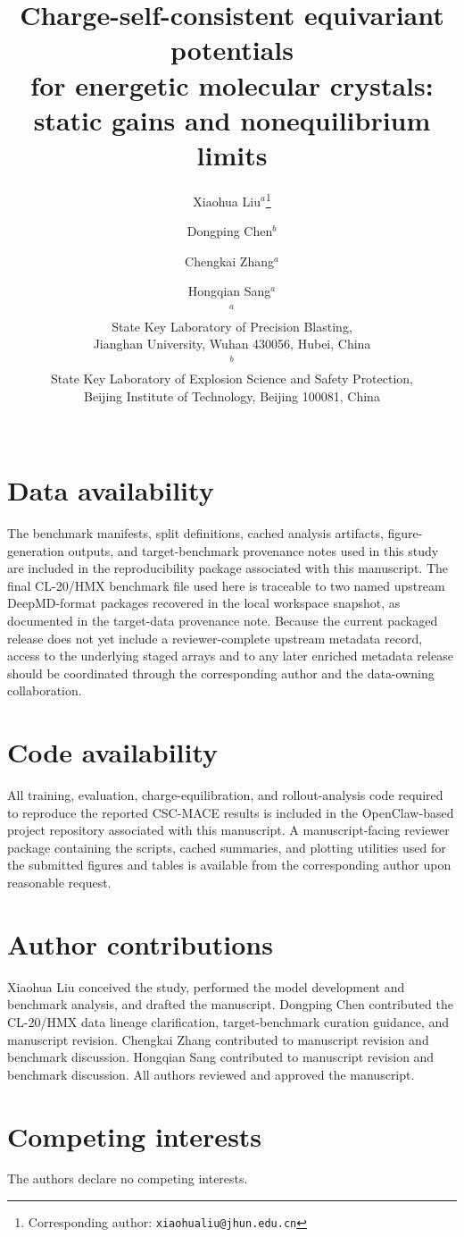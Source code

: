 \documentclass[11pt]{article}
\title{Charge-self-consistent equivariant potentials\\ for energetic molecular crystals: static gains and nonequilibrium limits}
\author{%
  Xiaohua Liu$^{a}$\thanks{Corresponding author: \texttt{xiaohualiu@jhun.edu.cn}}
  \and
  Dongping Chen$^{b}$
  \and
  Chengkai Zhang$^{a}$
  \and
  Hongqian Sang$^{a}$ \\
  $^{a}$\parbox{0.42\textwidth}{\centering State Key Laboratory of Precision Blasting,\\ Jianghan University, Wuhan 430056, Hubei, China}
  \hfill
  $^{b}$\parbox{0.42\textwidth}{\centering State Key Laboratory of Explosion Science and Safety Protection,\\ Beijing Institute of Technology, Beijing 100081, China} \\
}
\date{}
\begin{document}
\maketitle










\section*{Data availability}
The benchmark manifests, split definitions, cached analysis artifacts, figure-generation outputs, and target-benchmark provenance notes used in this study are included in the reproducibility package associated with this manuscript. The final CL-20/HMX benchmark file used here is traceable to two named upstream DeepMD-format packages recovered in the local workspace snapshot, as documented in the target-data provenance note. Because the current packaged release does not yet include a reviewer-complete upstream metadata record, access to the underlying staged arrays and to any later enriched metadata release should be coordinated through the corresponding author and the data-owning collaboration.

\section*{Code availability}
All training, evaluation, charge-equilibration, and rollout-analysis code required to reproduce the reported CSC-MACE results is included in the OpenClaw-based project repository associated with this manuscript. A manuscript-facing reviewer package containing the scripts, cached summaries, and plotting utilities used for the submitted figures and tables is available from the corresponding author upon reasonable request.

\section*{Author contributions}
Xiaohua Liu conceived the study, performed the model development and benchmark analysis, and drafted the manuscript. Dongping Chen contributed the CL-20/HMX data lineage clarification, target-benchmark curation guidance, and manuscript revision. Chengkai Zhang contributed to manuscript revision and benchmark discussion. Hongqian Sang contributed to manuscript revision and benchmark discussion. All authors reviewed and approved the manuscript.

\section*{Competing interests}
The authors declare no competing interests.



\end{document}
